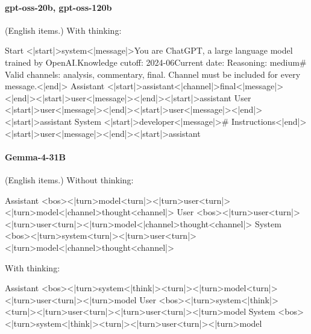 \paragraph{gpt-oss-20b, gpt-oss-120b} (English items.)
\noindent With thinking:
\begin{Rendering}
Start      <|start|>system<|message|>You are ChatGPT, a large language model trained by OpenAI.\NL{}Knowledge cutoff: 2024-06\NL{}Current date: \NL{}\NL{}Reasoning: medium\NL{}\NL{}# Valid channels: analysis, commentary, final. Channel must be included for every message.<|end|>
Assistant  <|start|>assistant<|channel|>final<|message|><|end|><|start|>user<|message|><|end|><|start|>assistant
User       <|start|>user<|message|><|end|><|start|>user<|message|><|end|><|start|>assistant
System     <|start|>developer<|message|># Instructions\NL{}\NL{}\NL{}\NL{}<|end|><|start|>user<|message|><|end|><|start|>assistant
\end{Rendering}
\paragraph{Gemma-4-31B} (English items.)
\noindent Without thinking:
\begin{Rendering}
Assistant  <bos><|turn>model\NL{}<turn|>\NL{}<|turn>user\NL{}<turn|>\NL{}<|turn>model\NL{}<|channel>thought\NL{}<channel|>
User       <bos><|turn>user\NL{}<turn|>\NL{}<|turn>user\NL{}<turn|>\NL{}<|turn>model\NL{}<|channel>thought\NL{}<channel|>
System     <bos><|turn>system\NL{}<turn|>\NL{}<|turn>user\NL{}<turn|>\NL{}<|turn>model\NL{}<|channel>thought\NL{}<channel|>
\end{Rendering}
\noindent With thinking:
\begin{Rendering}
Assistant  <bos><|turn>system\NL{}<|think|>\NL{}<turn|>\NL{}<|turn>model\NL{}<turn|>\NL{}<|turn>user\NL{}<turn|>\NL{}<|turn>model\NL{}
User       <bos><|turn>system\NL{}<|think|>\NL{}<turn|>\NL{}<|turn>user\NL{}<turn|>\NL{}<|turn>user\NL{}<turn|>\NL{}<|turn>model\NL{}
System     <bos><|turn>system\NL{}<|think|>\NL{}<turn|>\NL{}<|turn>user\NL{}<turn|>\NL{}<|turn>model\NL{}
\end{Rendering}
